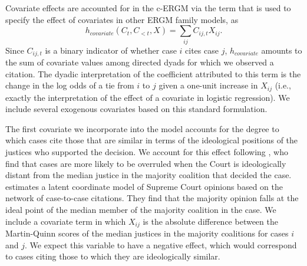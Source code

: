\documentclass[headsepline=true, abstracton]{scrartcl}
\begin{document}
Covariate effects are accounted for in the c-ERGM via the term that is used to specify the effect of covariates in other ERGM family models, as
$$h_{covariate}(C_t,C_{<t},X) =  \sum_{ij} C_{ij,t}X_{ij}.$$ Since $C_{ij,t}$ is a binary indicator of whether case $i$ cites case $j$, $h_{covariate}$ amounts to the sum of covariate values among directed dyads for which we observed a citation. The dyadic interpretation of the coefficient attributed to this term is the change in the log odds of a tie from $i$ to $j$ given a one-unit increase in $X_{ij}$ (i.e., exactly the interpretation of the effect of a covariate in logistic regression). We include several exogenous covariates based on this standard formulation. 

The first covariate we incorporate into the model accounts for the degree to which cases cite those that are similar in terms of the ideological positions of the justices who supported the decision. We account for this effect following \citet{spriggs2001explaining}, who find that cases are more likely to be overruled when the Court is ideologically distant from the median justice in the majority coalition that decided the case. \citet{clark2010locating} estimates a latent coordinate model of Supreme Court opinions based on the network of case-to-case citations. They find that the majority opinion falls at the ideal point of the median member of the majority coalition in the case. We include a covariate term in which $X_{ij}$ is the absolute difference between the Martin-Quinn scores \citep{martin2002dynamic} of the median justices in the majority coalitions for cases $i$ and $j$. We expect this variable to have a negative effect, which would correspond to cases citing those to which they are ideologically similar. %
\end{document}

